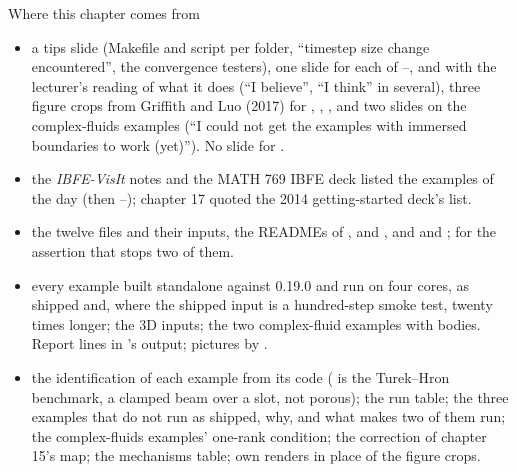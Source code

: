 \documentclass[aspectratio=169,11pt]{beamer}
\begin{document}
\begin{frame}{Where this chapter comes from}
\label{fr:sources}
\scriptsize
\begin{itemize}
  \item {} a tips slide (Makefile and script per folder, ``timestep size change encountered'', the convergence testers), one slide for each of --,  and  with the lecturer's reading of what it does (``I believe'', ``I think'' in several), three figure crops from Griffith and Luo (2017) for , , , and two slides on the complex-fluids examples (``I could not get the examples with immersed boundaries to work (yet)''). No slide for .
  \item {} the \emph{IBFE-VisIt} notes and the MATH 769 IBFE deck listed the examples of the day (then --); chapter 17 quoted the 2014 getting-started deck's list.
  \item {} the twelve  files and their inputs, the READMEs of ,  and , and  and ;  for the assertion that stops two of them.
  \item {} every example built standalone against 0.19.0 and run on four cores, as shipped and, where the shipped input is a hundred-step smoke test, twenty times longer; the 3D inputs; the two complex-fluid examples with bodies. Report lines in 's output; pictures by .
  \item {} the identification of each example from its code ( is the Turek--Hron benchmark,  a clamped beam over a slot,  not porous); the run table; the three examples that do not run as shipped, why, and what makes two of them run; the complex-fluids examples' one-rank condition; the correction of chapter 15's map; the mechanisms table; own renders in place of the figure crops.
\end{itemize}
\end{frame}
\end{document}
